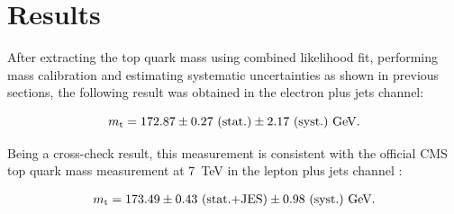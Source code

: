 \begin{description}[wide=\parindent]


\end{description}

\section{Results}
\label{s_top_mass:results}

After extracting the top quark mass using combined likelihood fit, performing mass calibration and estimating systematic
uncertainties as shown in previous sections, the following result was obtained in the electron plus jets channel:

\begin{equation}
	m_\mathrm{t} = 172.87 \pm 0.27~\textrm{(stat.)} \pm 2.17~\textrm{(syst.)}~\textrm{GeV}.
	\label{final_result}
\end{equation}

Being a cross-check result, this measurement is consistent with the official CMS top quark mass measurement at
\SI{7}{\TeV} in the lepton plus jets channel \autocite{top_mass_ljets_CMS}:

\begin{equation}
\begin{split}
	m_\mathrm{t} = 173.49 \pm 0.43~\textrm{(stat.+JES)} \pm 0.98~\textrm{(syst.)}~\textrm{GeV}.\\
	\label{final_result_official_ljets}
\end{split}
\end{equation}

